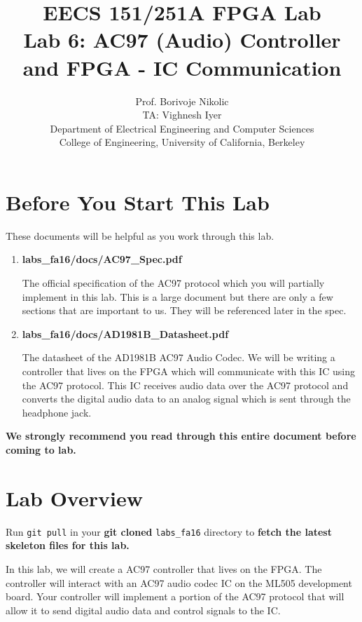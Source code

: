 \documentclass[11pt]{article}
\begin{document}
\title{EECS 151/251A FPGA Lab\\
Lab 6: AC97 (Audio) Controller and FPGA - IC Communication}

\author{Prof. Borivoje Nikolic \\
TA: Vighnesh Iyer \\Department of Electrical Engineering and Computer Sciences\\
College of Engineering, University of California, Berkeley}
\date{}
\maketitle

\tableofcontents

\section{Before You Start This Lab}

These documents will be helpful as you work through this lab.

\begin{enumerate}
	\item \textbf{labs\_fa16/docs/AC97\_Spec.pdf}
	
	The official specification of the AC97 protocol which you will partially implement in this lab. This is a large document but there are only a few sections that are important to us. They will be referenced later in the spec.
	
	\item \textbf{labs\_fa16/docs/AD1981B\_Datasheet.pdf}
	
	The datasheet of the AD1981B AC97 Audio Codec. We will be writing a controller that lives on the FPGA which will communicate with this IC using the AC97 protocol. This IC receives audio data over the AC97 protocol and converts the digital audio data to an analog signal which is sent through the headphone jack.
\end{enumerate}

\textbf{We strongly recommend you read through this entire document before coming to lab.}

\section{Lab Overview}
Run \verb|git pull| in your \textbf{git cloned} \verb|labs_fa16| directory to \textbf{fetch the latest skeleton files for this lab.}

In this lab, we will create a AC97 controller that lives on the FPGA. The controller will interact with an AC97 audio codec IC on the ML505 development board. Your controller will implement a portion of the AC97 protocol that will allow it to send digital audio data and control signals to the IC.
\end{document}
